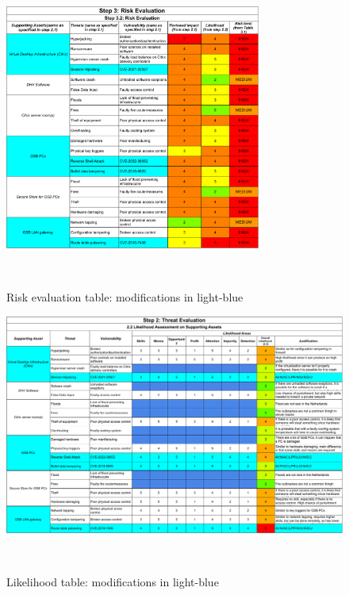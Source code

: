 \begin{figure}[!hb]
    \centering
    \includegraphics[keepaspectratio,width=0.75\textwidth]{03-risk-analysis/003-TE/img/RevisedRiskEval.pdf}
    \caption{Risk evaluation table: modifications in light-blue}~\label{fig:riskEvalRev}
\end{figure}

\begin{figure}
    \centering
    \includegraphics[keepaspectratio,width=\textwidth]{03-risk-analysis/003-TE/img/Revised_likelihood.pdf}
    \caption{Likelihood table: modifications in light-blue}~\label{fig:likelihoodRev}
\end{figure}
